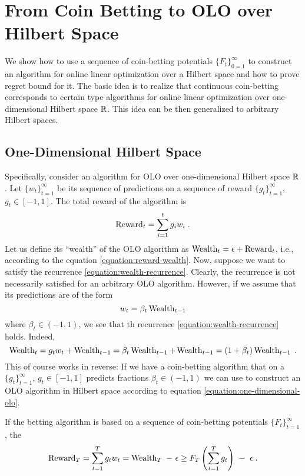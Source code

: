 \section{From Coin Betting to OLO over Hilbert Space}

We show how to use a sequence of coin-betting potentials $\{F_t\}_{0=1}^\infty$
to construct an algorithm for online linear optimization over a Hilbert space
and how to prove regret bound for it. The basic idea is to realize that
continuous coin-betting corresponds to certain type algorithms
for online linear optimization over one-dimensional Hilbert space $\mathbb{R}$.
This idea can be then generalized to arbitrary Hilbert spaces.

\subsection{One-Dimensional Hilbert Space}

Specifically, consider an algorithm for OLO over one-dimensional Hilbert space
$\mathbb{R}$. Let $\{w_t\}_{t=1}^\infty$ be its sequence of predictions on a sequence
of reward $\{g_t\}_{t=1}^\infty$, $g_t \in [-1,1]$. The total reward of the algorithm is
$$
\operatorname{Reward}_t = \sum_{i=1}^t g_i w_i \; .
$$
Let us define its ``wealth'' of the OLO algorithm as $\operatorname{Wealth}_t = \epsilon +
\operatorname{Reward}_t$, i.e., according to the equation \eqref{equation:reward-wealth}. Now,
suppose we want to satisfy the recurrence \eqref{equation:wealth-recurrence}.
Clearly, the recurrence is not necessarily satisfied for an arbitrary
OLO algorithm. However, if we assume that its predictions are of the form
\begin{equation}
\label{equation:one-dimensional-olo}
w_t = \beta_t \operatorname{Wealth}_{t-1}
\end{equation}
where $\beta_t \in (-1,1)$, we see that th recurrence \eqref{equation:wealth-recurrence} holds.
Indeed,
$$
\operatorname{Wealth}_t = g_t w_t + \operatorname{Wealth}_{t-1} = \beta_t \operatorname{Wealth}_{t-1} + \operatorname{Wealth}_{t-1} = (1+\beta_t) \operatorname{Wealth}_{t-1} \; .
$$
This of course works in reverse: If we have a coin-betting algorithm that on a
$\{g_t\}_{t=1}^\infty$, $g_t \in [-1,1]$ predicts fractions $\beta_t \in (-1,1)$
we can use to construct an OLO algorithm in Hilbert space according to equation
\eqref{equation:one-dimensional-olo}.

If the betting algorithm is based on a sequence of coin-betting potentials
$\{F_t\}_{t=1}^\infty$, the
$$
\Reward_T = \sum_{t=1}^T g_t w_t = \Wealth_T \ - \ \epsilon \ge F_T\left(\sum_{t=1}^T g_t \right) \ - \ \epsilon \; .
$$

